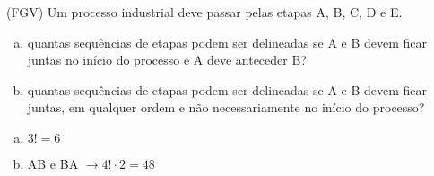 \begin{ex}
(FGV) Um processo industrial deve passar pelas etapas A, B, C, D e E.
   \begin{enumerate}[(a)]
   \item quantas sequências de etapas podem ser delineadas se A e B devem ficar juntas no início do processo e A deve anteceder B?
   \item quantas sequências de etapas podem ser delineadas se A e B devem ficar juntas, em qualquer ordem e não necessariamente no início do processo?
   \end{enumerate}
     \begin{sol}
       \phantom{A}
         \begin{enumerate} [(a)]
             \item $3!=6$
             \item AB e BA $\rightarrow 4! \cdot2=48$
         \end{enumerate}
     \end{sol}
\end{ex}